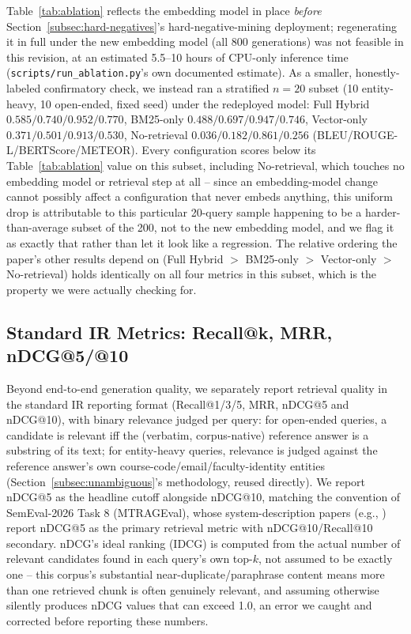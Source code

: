 \documentclass[a4paper,twoside]{article}
\begin{document}
Table~\ref{tab:ablation} reflects the embedding model in place \emph{before} Section~\ref{subsec:hard-negatives}'s hard-negative-mining deployment; regenerating it in full under the new embedding model (all 800 generations) was not feasible in this revision, at an estimated 5.5--10 hours of CPU-only inference time (\texttt{scripts/run\_ablation.py}'s own documented estimate). As a smaller, honestly-labeled confirmatory check, we instead ran a stratified $n=20$ subset (10 entity-heavy, 10 open-ended, fixed seed) under the redeployed model: Full Hybrid $0.585/0.740/0.952/0.770$, BM25-only $0.488/0.697/0.947/0.746$, Vector-only $0.371/0.501/0.913/0.530$, No-retrieval $0.036/0.182/0.861/0.256$ (BLEU/ROUGE-L/BERTScore/METEOR). Every configuration scores below its Table~\ref{tab:ablation} value on this subset, including No-retrieval, which touches no embedding model or retrieval step at all -- since an embedding-model change cannot possibly affect a configuration that never embeds anything, this uniform drop is attributable to this particular 20-query sample happening to be a harder-than-average subset of the 200, not to the new embedding model, and we flag it as exactly that rather than let it look like a regression. The relative ordering the paper's other results depend on (Full Hybrid $>$ BM25-only $>$ Vector-only $>$ No-retrieval) holds identically on all four metrics in this subset, which is the property we were actually checking for.

\subsection{Standard IR Metrics: Recall@k, MRR, nDCG@5/@10}
\label{subsec:ir-metrics}

Beyond end-to-end generation quality, we separately report retrieval quality in the standard IR reporting format (Recall@1/3/5, MRR, nDCG@5 and nDCG@10), with binary relevance judged per query: for open-ended queries, a candidate is relevant iff the (verbatim, corpus-native) reference answer is a substring of its text; for entity-heavy queries, relevance is judged against the reference answer's own course-code/email/faculty-identity entities (Section~\ref{subsec:unambiguous}'s methodology, reused directly). We report nDCG@5 as the headline cutoff alongside nDCG@10, matching the convention of SemEval-2026 Task 8 (MTRAGEval), whose system-description papers (e.g., \citet{athanasiou2026semeval}) report nDCG@5 as the primary retrieval metric with nDCG@10/Recall@10 secondary. nDCG's ideal ranking (IDCG) is computed from the actual number of relevant candidates found in each query's own top-$k$, not assumed to be exactly one -- this corpus's substantial near-duplicate/paraphrase content means more than one retrieved chunk is often genuinely relevant, and assuming otherwise silently produces nDCG values that can exceed 1.0, an error we caught and corrected before reporting these numbers.
\end{document}
